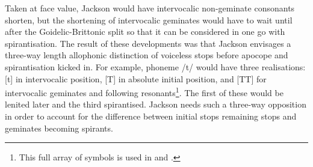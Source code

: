 Taken at face value, Jackson would have intervocalic non-geminate consonants shorten, but the shortening of intervocalic geminates would have to wait until after the Goidelic-Brittonic split so that it can be considered in one go with spirantisation. The result of these developments was that Jackson envisages a three-way length allophonic distinction of voiceless stops before apocope and spirantisation kicked in. For example, phoneme /t/ would have three realisations: [t] in intervocalic position, [T] in absolute initial position, and [TT] for intervocalic geminates and following resonants\footnote{This full array of symbols is used in \textcite{Jac_Gemination60} and \textcite{Jac_Historical67}.}. The first of these would be lenited later and the third spirantised. Jackson needs such a three-way opposition in order to account for the difference between initial stops remaining stops and geminates becoming spirants. 


